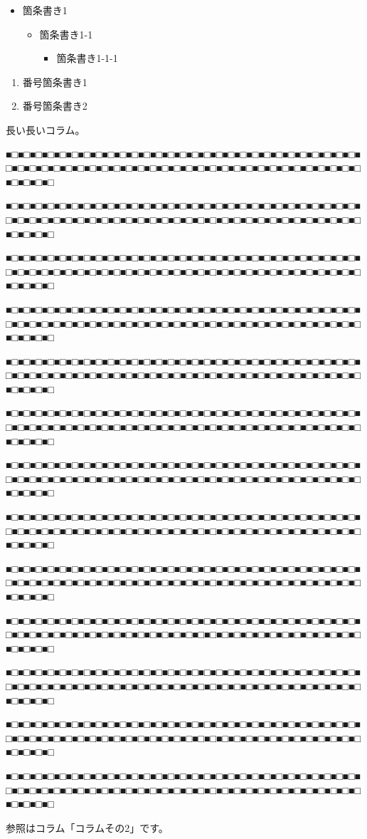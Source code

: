 \begin{itemize}
\item 箇条書き1
\begin{itemize}
\item 箇条書き1{-}1
\begin{itemize}
\item 箇条書き1{-}1{-}1
\end{itemize}


\end{itemize}


\end{itemize}


\begin{enumerate}
\item 番号箇条書き1
\item 番号箇条書き2
\end{enumerate}


長い長いコラム。

■□■□■□■□■□■□■□■□■□■□■□■□■□■□■□■□■□■□■□■□■□■□■□■□■□■□■□■□■□■□■□■□■□■□■□■□■□■□■□■□■□■□■□■□■□■□■□■□■□■□■□■□■□■□■□■□■□■□■□■□■□■□■□

■□■□■□■□■□■□■□■□■□■□■□■□■□■□■□■□■□■□■□■□■□■□■□■□■□■□■□■□■□■□■□■□■□■□■□■□■□■□■□■□■□■□■□■□■□■□■□■□■□■□■□■□■□■□■□■□■□■□■□■□■□■□■□

■□■□■□■□■□■□■□■□■□■□■□■□■□■□■□■□■□■□■□■□■□■□■□■□■□■□■□■□■□■□■□■□■□■□■□■□■□■□■□■□■□■□■□■□■□■□■□■□■□■□■□■□■□■□■□■□■□■□■□■□■□■□■□

■□■□■□■□■□■□■□■□■□■□■□■□■□■□■□■□■□■□■□■□■□■□■□■□■□■□■□■□■□■□■□■□■□■□■□■□■□■□■□■□■□■□■□■□■□■□■□■□■□■□■□■□■□■□■□■□■□■□■□■□■□■□■□

■□■□■□■□■□■□■□■□■□■□■□■□■□■□■□■□■□■□■□■□■□■□■□■□■□■□■□■□■□■□■□■□■□■□■□■□■□■□■□■□■□■□■□■□■□■□■□■□■□■□■□■□■□■□■□■□■□■□■□■□■□■□■□

■□■□■□■□■□■□■□■□■□■□■□■□■□■□■□■□■□■□■□■□■□■□■□■□■□■□■□■□■□■□■□■□■□■□■□■□■□■□■□■□■□■□■□■□■□■□■□■□■□■□■□■□■□■□■□■□■□■□■□■□■□■□■□

■□■□■□■□■□■□■□■□■□■□■□■□■□■□■□■□■□■□■□■□■□■□■□■□■□■□■□■□■□■□■□■□■□■□■□■□■□■□■□■□■□■□■□■□■□■□■□■□■□■□■□■□■□■□■□■□■□■□■□■□■□■□■□

■□■□■□■□■□■□■□■□■□■□■□■□■□■□■□■□■□■□■□■□■□■□■□■□■□■□■□■□■□■□■□■□■□■□■□■□■□■□■□■□■□■□■□■□■□■□■□■□■□■□■□■□■□■□■□■□■□■□■□■□■□■□■□

■□■□■□■□■□■□■□■□■□■□■□■□■□■□■□■□■□■□■□■□■□■□■□■□■□■□■□■□■□■□■□■□■□■□■□■□■□■□■□■□■□■□■□■□■□■□■□■□■□■□■□■□■□■□■□■□■□■□■□■□■□■□■□

■□■□■□■□■□■□■□■□■□■□■□■□■□■□■□■□■□■□■□■□■□■□■□■□■□■□■□■□■□■□■□■□■□■□■□■□■□■□■□■□■□■□■□■□■□■□■□■□■□■□■□■□■□■□■□■□■□■□■□■□■□■□■□

■□■□■□■□■□■□■□■□■□■□■□■□■□■□■□■□■□■□■□■□■□■□■□■□■□■□■□■□■□■□■□■□■□■□■□■□■□■□■□■□■□■□■□■□■□■□■□■□■□■□■□■□■□■□■□■□■□■□■□■□■□■□■□

■□■□■□■□■□■□■□■□■□■□■□■□■□■□■□■□■□■□■□■□■□■□■□■□■□■□■□■□■□■□■□■□■□■□■□■□■□■□■□■□■□■□■□■□■□■□■□■□■□■□■□■□■□■□■□■□■□■□■□■□■□■□■□

■□■□■□■□■□■□■□■□■□■□■□■□■□■□■□■□■□■□■□■□■□■□■□■□■□■□■□■□■□■□■□■□■□■□■□■□■□■□■□■□■□■□■□■□■□■□■□■□■□■□■□■□■□■□■□■□■□■□■□■□■□■□■□

参照はコラム「コラムその2」です。
